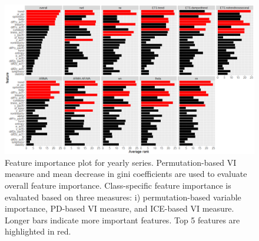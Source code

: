 \documentclass[11pt,a4paper,]{article}
\begin{document}
\begin{figure}
\centering
\includegraphics{figures/viyearly-1.png}
\caption{\label{fig:viyearly}Feature importance plot for yearly series.
Permutation-based VI measure and mean decrease in gini coefficients are
used to evaluate overall feature importance. Class-specific feature
importance is evaluated based on three measures: i) permutation-based
variable importance, PD-based VI measure, and ICE-based VI measure.
Longer bars indicate more important features. Top 5 features are
highlighted in red.}
\end{figure}

\newpage
\end{document}
